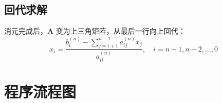 \documentclass[a4paper,10pt]{article}
\begin{document}
\subsection{回代求解}

消元完成后，$\mathbf{A}$ 变为上三角矩阵，从最后一行向上回代：
\begin{equation}
  x_i = \frac{b_i^{(n)} - \displaystyle\sum_{j=i+1}^{n-1} a_{ij}^{(n)} x_j}{a_{ii}^{(n)}}, \quad i = n{-}1, n{-}2, \ldots, 0
\end{equation}

\section{程序流程图}
\end{document}
